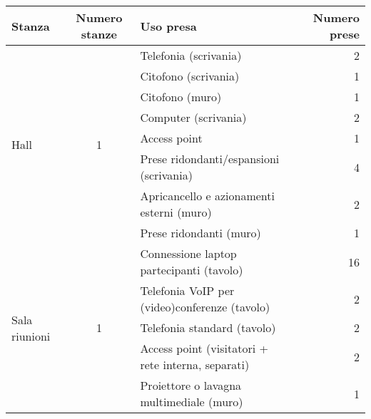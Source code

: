 \begin{table}[h]
  \begin{adjustbox}{center}
    \begin{tabular}{@{}lclr@{}}
      \toprule
      Stanza                         & Numero stanze       & Uso presa                                          & Numero prese \\ \midrule
      \multirow{8}{*}{Hall}          & \multirow{8}{*}{1}  & Telefonia (scrivania)                              & 2            \\
                                     &                     & Citofono (scrivania)                               & 1            \\
                                     &                     & Citofono (muro)                                    & 1            \\
                                     &                     & Computer (scrivania)                               & 2            \\
                                     &                     & Access point                                       & 1            \\
                                     &                     & Prese ridondanti/espansioni (scrivania)            & 4            \\
                                     &                     & Apricancello e azionamenti esterni (muro)          & 2            \\
                                     &                     & Prese ridondanti (muro)                            & 1            \\ \midrule
      \multirow{7}{*}{Sala riunioni} & \multirow{7}{*}{1}  & Connessione laptop partecipanti (tavolo)           & 16           \\
                                     &                     & Telefonia VoIP per (video)conferenze (tavolo)      & 2            \\
                                     &                     & Telefonia standard (tavolo)                        & 2            \\
                                     &                     & Access point (visitatori + rete interna, separati) & 2            \\
                                     &                     & Proiettore o lavagna multimediale (muro)           & 1            \\

\end{tabular}
\end{adjustbox}
\end{table}
